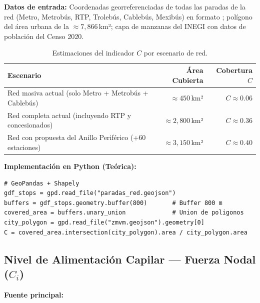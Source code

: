 \textbf{Datos de entrada:} Coordenadas georreferenciadas de todas las paradas de
la red (Metro, Metrobús, RTP, Trolebús, Cablebús, Mexibús) en formato \geojson{};
polígono del área urbana de la \zmvm{} $\approx 7{,}866$\,km²; capa de manzanas
del INEGI con datos de población del Censo 2020.


\begin{table}[H]
    \centering
    \caption{Estimaciones del indicador $C$ por escenario de red.}
    \label{tab:cobertura-escenarios}
    \begin{tabularx}{\textwidth}{X r r}
        \toprule
        \textbf{Escenario} & \textbf{Área Cubierta} & \textbf{Cobertura $C$} \\
        \midrule
        Red masiva actual (solo Metro + Metrobús + Cablebús)
            & $\approx 450$\,km² & $C \approx 0.06$ \\
        Red completa actual (incluyendo RTP y concesionados)
            & $\approx 2{,}800$\,km² & $C \approx 0.36$ \\
        Red con propuesta del Anillo Periférico (+60 estaciones)
            & $\approx 3{,}150$\,km² & $C \approx 0.40$ \\
        \bottomrule
    \end{tabularx}
\end{table}

\textbf{Implementación en Python (Teórica):}

\begin{lstlisting}[style=estiloPython, caption={Cálculo del indicador $C$ con GeoPandas.}, label={lst:cobertura}]
# GeoPandas + Shapely
gdf_stops = gpd.read_file("paradas_red.geojson")
buffers = gdf_stops.geometry.buffer(800)       # Buffer 800 m
covered_area = buffers.unary_union             # Union de poligonos
city_polygon = gpd.read_file("zmvm.geojson").geometry[0]
C = covered_area.intersection(city_polygon).area / city_polygon.area
\end{lstlisting}

\subsection{Nivel de Alimentación Capilar --- Fuerza Nodal \texorpdfstring{($C_i$)}{(Ci)}}
\label{subsec:alimentacion-capilar}

\textbf{Fuente principal:} \textcite{lee2008}

